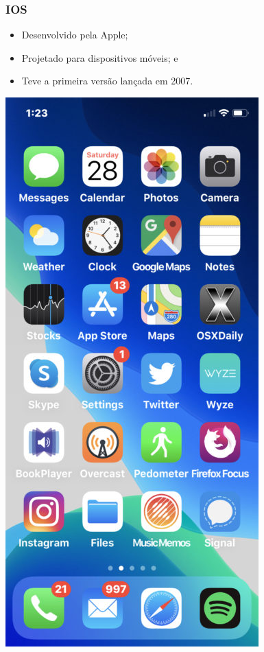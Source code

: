 \documentclass[aspectratio=169]{beamer} %
\begin{document}
\begin{frame}
	\frametitle{IOS}
	
	\begin{itemize}
		\item Desenvolvido pela Apple;
		\item Projetado para dispositivos móveis; e
		\item Teve a primeira versão lançada em 2007.
	\end{itemize}\vfill
	
	\begin{center}
		\includegraphics[scale=0.15]{img/ios}
	\end{center}
\end{frame}
\end{document}
